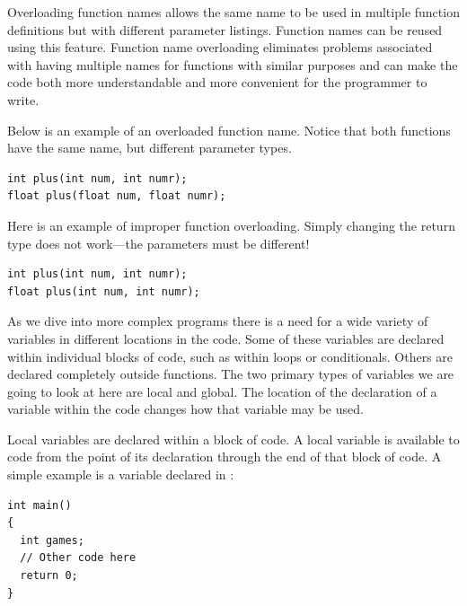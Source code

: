 
Overloading function names allows the same name to be used in multiple function definitions but with different parameter listings. 
Function names can be reused using this feature. 
Function name overloading eliminates problems associated with having multiple names for functions with similar purposes and can make the code both more understandable and more convenient for the programmer to write.

Below is an example of an overloaded function name. 
Notice that both functions have the same name, but different parameter types. \nopagebreak[1]

\noindent\begin{minipage}{\linewidth}\begin{lstlisting}
int plus(int num, int numr);
float plus(float num, float numr);
\end{lstlisting}\end{minipage}

Here is an example of improper function overloading. 
Simply changing the return type does not work---the parameters must be different!

\noindent\begin{minipage}{\linewidth}\begin{lstlisting}
int plus(int num, int numr);
float plus(int num, int numr);  
\end{lstlisting}\end{minipage}



As we dive into more complex programs there is a need for a wide variety of variables in different locations in the code. 
Some of these variables are declared within individual blocks of code, such as within loops or conditionals. 
Others are declared completely outside functions. 
The two primary types of variables we are going to look at here are local and global. 
The location of the declaration of a variable within the code changes how that variable may be used.
	
Local variables are declared within a block of code. 
A local variable is available to code from the point of its declaration through the end of that block of code. 
A simple example is a variable declared in :

\noindent\begin{minipage}{\linewidth}\begin{lstlisting}
int main()
{
  int games;
  // Other code here
  return 0;
}
\end{lstlisting}\end{minipage}

